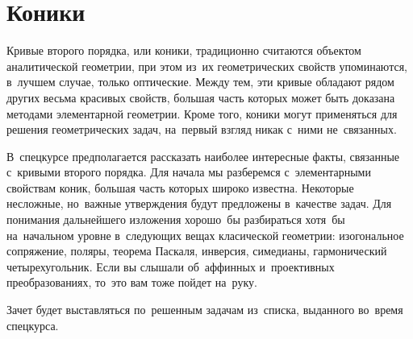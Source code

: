 
\section*{Коники}



Кривые второго порядка, или коники, традиционно считаются объектом
аналитической геометрии, при этом из~их геометрических свойств упоминаются,
в~лучшем случае, только оптические.
Между тем, эти кривые обладают рядом других весьма красивых свойств, большая
часть которых может быть доказана методами элементарной геометрии.
Кроме того, коники могут применяться для решения геометрических задач,
на~первый взгляд никак с~ними не~связанных.

В~спецкурсе предполагается рассказать наиболее интересные факты, связанные
с~кривыми второго порядка.
Для начала мы разберемся с~элементарными свойствам коник, большая часть которых
широко известна.
Некоторые несложные, но~важные утверждения будут предложены в~качестве задач.
Для понимания дальнейшего изложения хорошо~бы разбираться хотя~бы на~начальном
уровне в~следующих вещах класической геометрии:
изогональное сопряжение, поляры, теорема Паскаля, инверсия, симедианы,
гармонический четырехугольник.
Если вы слышали об~аффинных и~проективных преобразованиях, то~это вам тоже
пойдет на~руку.

Зачет будет выставляться по~решенным задачам из~списка, выданного во~время
спецкурса.

